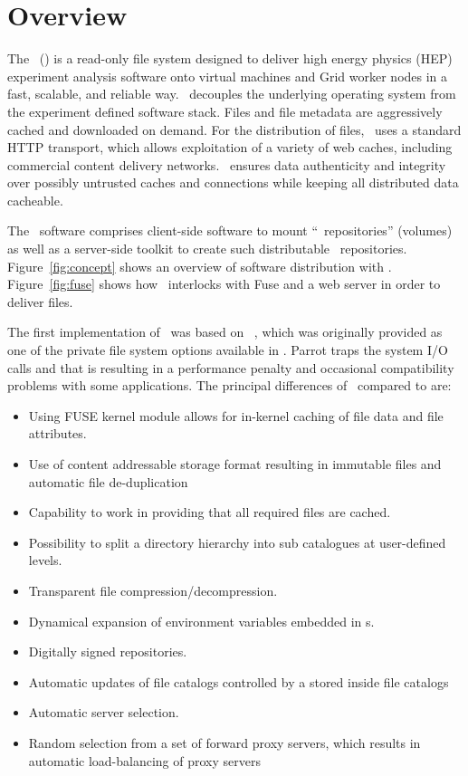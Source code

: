 \chapter{Overview}

The \cernvmfs\ (\cvmfs) is a read-only file system designed to deliver high energy physics (HEP) experiment analysis software onto virtual machines and Grid worker nodes in a fast, scalable, and reliable way.
\cvmfs\ decouples the underlying operating system from the experiment defined software stack.
Files and file metadata are aggressively cached and downloaded on demand.
For the distribution of files, \cvmfs\ uses a standard HTTP transport, which allows exploitation of a variety of web caches, including commercial content delivery networks.
\cvmfs\ ensures data authenticity and integrity over possibly untrusted caches and connections while keeping all distributed data cacheable.

The \cvmfs\ software comprises client-side software to mount ``\cvmfs\ repositories'' (volumes) as well as a server-side toolkit to create such distributable \cvmfs\ repositories.
Figure~\ref{fig:concept} shows an overview of software distribution with \cvmfs.
Figure~\ref{fig:fuse} shows how \cvmfs\ interlocks with Fuse and a web server in order to deliver files.

The first implementation of \cvmfs\ was based on ~\cite{parrot05, growfs09}, which was originally provided as one of the private file system options available in . 
Parrot traps the system I/O calls and that is resulting in a performance penalty and occasional compatibility problems with some applications. 
The principal differences of \cvmfs\ compared to  are:
\begin{itemize}
	\item Using FUSE kernel module allows for in-kernel caching of file data and file attributes.
	\item Use of content addressable storage format resulting in immutable files and automatic file de-duplication
	\item Capability to work in  providing that all required files are cached.
	\item Possibility to split a directory hierarchy into sub catalogues at user-defined levels.
	\item Transparent file compression/decompression.
	\item Dynamical expansion of environment variables embedded in s.
	\item Digitally signed repositories.
	\item Automatic updates of file catalogs controlled by a  stored inside file catalogs
	\item Automatic server selection.
	\item Random selection from a set of forward proxy servers, which results in automatic load-balancing of proxy servers
\end{itemize}

